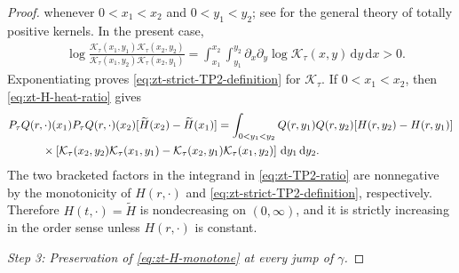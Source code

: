 \documentclass[10pt]{amsart}
\theoremstyle{definition}
\theoremstyle{remark}
\numberwithin{equation}{section}
\newcommand{\1}{\mathbf 1}
\newcommand{\dd}{\,\mathrm d}
\begin{document}
\begin{proof}
whenever $0<x_1<x_2$ and $0<y_1<y_2$; see \cite{Karlin1968} for the general theory of totally positive kernels. In the present case,
\begin{align*}
 &\log\frac{\mathcal K_\tau(x_1,y_1)\mathcal K_\tau(x_2,y_2)}
 {\mathcal K_\tau(x_1,y_2)\mathcal K_\tau(x_2,y_1)}=\int_{x_1}^{x_2}\int_{y_1}^{y_2}
 \partial_x\partial_y\log\mathcal K_\tau(x,y)\dd y\dd x>0.
\end{align*}
Exponentiating proves \eqref{eq:zt-strict-TP2-definition} for $\mathcal K_\tau$. If $0<x_1<x_2$, then \eqref{eq:zt-H-heat-ratio} gives
\begin{align}
 &P_\tau Q(r,\cdot)(x_1)P_\tau Q(r,\cdot)(x_2)
 [\widetilde H(x_2)-\widetilde H(x_1)]=\int_{0<y_1<y_2}Q(r,y_1)Q(r,y_2)
 [H(r,y_2)-H(r,y_1)]\notag\\
 &\qquad\quad\times\left[
 \mathcal K_\tau(x_2,y_2)\mathcal K_\tau(x_1,y_1)
 -\mathcal K_\tau(x_2,y_1)\mathcal K_\tau(x_1,y_2)
 \right]\dd y_1\dd y_2.                                      \label{eq:zt-TP2-ratio}
\end{align}
The two bracketed factors in the integrand in \eqref{eq:zt-TP2-ratio} are nonnegative by the monotonicity of $H(r,\cdot)$ and \eqref{eq:zt-strict-TP2-definition}, respectively. Therefore $H(t,\cdot)=\widetilde H$ is nondecreasing on $(0,\infty)$, and it is strictly increasing in the order sense unless $H(r,\cdot)$ is constant.

\smallskip
\noindent\emph{Step 3: Preservation of \eqref{eq:zt-H-monotone} at every jump of $\gamma$.}


\end{proof}
\end{document}
